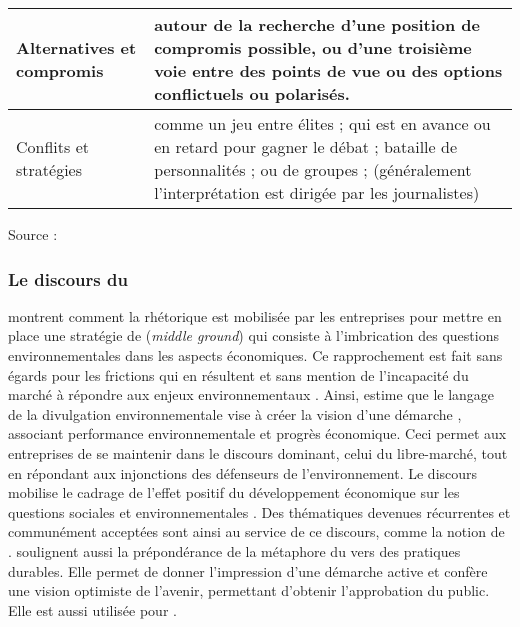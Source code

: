 \begin{table}[h]
\begin{tabularx}{\linewidth}{|K{0.30\textwidth}|X|}
                    Alternatives et compromis
                    & autour de la recherche d'une position de compromis possible, ou d'une troisième voie entre des points de vue ou des options conflictuels ou polarisés.
                    \\ \hline

                    Conflits et stratégies
                    & comme un jeu entre élites ; qui est en avance ou en retard pour gagner le débat ; bataille de personnalités ; ou de groupes ; (généralement l'interprétation est dirigée par les journalistes)
                    \\ \hline
                \end{tabularx}
                \footnotesize{Source : \textcite{nisbet2010framing}}
            \end{table}


        \subsubsection{Le discours du }
            \textcite{higgins2012ethos} montrent comment la rhétorique est mobilisée par les entreprises pour mettre en place une stratégie de  (\textit{middle ground}) qui consiste à l'imbrication des questions environnementales dans les aspects économiques. Ce rapprochement est fait sans égards pour les frictions qui en résultent et sans mention de l'incapacité du marché à répondre aux enjeux environnementaux \parencite{livesey2002discourse}. Ainsi, \textcite{laine2005meanings} estime que le langage de la divulgation environnementale vise à créer la vision d'une démarche , associant performance environnementale et progrès économique. Ceci permet aux entreprises de se maintenir dans le discours dominant, celui du libre-marché, tout en répondant aux injonctions des défenseurs de l'environnement. Le discours mobilise le cadrage de l'effet positif du développement économique sur les questions sociales et environnementales \parencite{livesey2002discourse}. Des thématiques devenues récurrentes et communément acceptées sont ainsi au service de ce discours, comme la notion de  \parencite{higgins2012ethos}. \textcite{milne2006creating} soulignent aussi la prépondérance de la métaphore du  vers des pratiques durables. Elle permet de donner l'impression d'une démarche active et confère une vision optimiste de l'avenir, permettant d'obtenir l'approbation du public. Elle est aussi utilisée pour . \\

